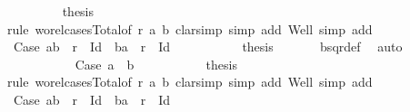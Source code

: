 \begin{isabellebody}
\ \ \ \ \ \ \ \isamarkupfalse%
\ {\isacharquery}{\kern0pt}thesis\isanewline
\ \ \ \ \ \ \ \isamarkupfalse%
{\isacharparenleft}{\kern0pt}rule\ wo{\isacharunderscore}{\kern0pt}rel{\isachardot}{\kern0pt}cases{\isacharunderscore}{\kern0pt}Total{}{\isacharbrackleft}{\kern0pt}of\ r\ a{}\ b{}{\isacharbrackright}{\kern0pt}{\isacharcomma}{\kern0pt}\ clarsimp\ simp\ add{\isacharcolon}{\kern0pt}\ Well{\isacharcomma}{\kern0pt}\ simp\ add{\isacharcolon}{\kern0pt}\ {}{\isacharparenright}{\kern0pt}\isanewline
\ \ \ \ \ \ \ \ \ \isamarkupfalse%
\ Case{}{}{}{\isacharcolon}{\kern0pt}\ {\isachardoublequoteopen}{\isacharparenleft}{\kern0pt}a{}{\isacharcomma}{\kern0pt}b{}{\isacharparenright}{\kern0pt}\ {\isasymin}\ r\ {\isacharminus}{\kern0pt}\ Id\ {\isasymor}\ {\isacharparenleft}{\kern0pt}b{}{\isacharcomma}{\kern0pt}a{}{\isacharparenright}{\kern0pt}\ {\isasymin}\ r\ {\isacharminus}{\kern0pt}\ Id{\isachardoublequoteclose}\isanewline
\ \ \ \ \ \ \ \ \ \isamarkupfalse%
\ {\isacharquery}{\kern0pt}thesis\ \isamarkupfalse%
\ {}\ {}\ {}\ \isamarkupfalse%
\ bsqr{\isacharunderscore}{\kern0pt}def\ \isamarkupfalse%
\ auto\isanewline
\ \ \ \ \ \ \ \isamarkupfalse%
\isanewline
\ \ \ \ \ \ \ \ \ \isamarkupfalse%
\ Case{}{}{}{\isacharcolon}{\kern0pt}\ {\isachardoublequoteopen}a{}\ {\isacharequal}{\kern0pt}\ b{}{\isachardoublequoteclose}\isanewline
\ \ \ \ \ \ \ \ \ \isamarkupfalse%
\ {\isacharquery}{\kern0pt}thesis\isanewline
\ \ \ \ \ \ \ \ \ \isamarkupfalse%
{\isacharparenleft}{\kern0pt}rule\ wo{\isacharunderscore}{\kern0pt}rel{\isachardot}{\kern0pt}cases{\isacharunderscore}{\kern0pt}Total{}{\isacharbrackleft}{\kern0pt}of\ r\ a{}\ b{}{\isacharbrackright}{\kern0pt}{\isacharcomma}{\kern0pt}\ clarsimp\ simp\ add{\isacharcolon}{\kern0pt}\ Well{\isacharcomma}{\kern0pt}\ simp\ add{\isacharcolon}{\kern0pt}\ {}{\isacharparenright}{\kern0pt}\isanewline
\ \ \ \ \ \ \ \ \ \ \ \isamarkupfalse%
\ Case{}{}{}{}{\isacharcolon}{\kern0pt}\ {\isachardoublequoteopen}{\isacharparenleft}{\kern0pt}a{}{\isacharcomma}{\kern0pt}b{}{\isacharparenright}{\kern0pt}\ {\isasymin}\ r\ {\isacharminus}{\kern0pt}\ Id\ {\isasymor}\ {\isacharparenleft}{\kern0pt}b{}{\isacharcomma}{\kern0pt}a{}{\isacharparenright}{\kern0pt}\ {\isasymin}\ r\ {\isacharminus}{\kern0pt}\ Id{\isachardoublequoteclose}\isanewline

\end{isabellebody}
